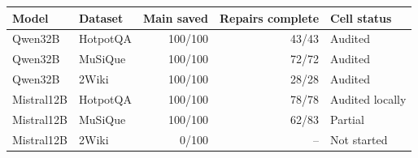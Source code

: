 \begin{tabular}{llrrl}
\toprule
Model & Dataset & Main saved & Repairs complete & Cell status \\
\midrule
Qwen32B & HotpotQA & 100/100 & 43/43 & Audited \\
Qwen32B & MuSiQue & 100/100 & 72/72 & Audited \\
Qwen32B & 2Wiki & 100/100 & 28/28 & Audited \\
Mistral12B & HotpotQA & 100/100 & 78/78 & Audited locally \\
Mistral12B & MuSiQue & 100/100 & 62/83 & Partial \\
Mistral12B & 2Wiki & 0/100 & -- & Not started \\
\bottomrule
\end{tabular}
